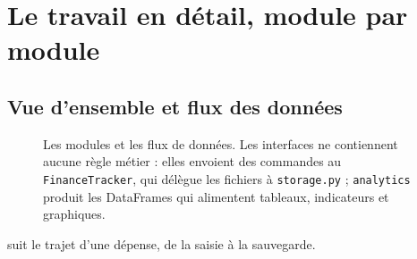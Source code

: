 \documentclass[11pt,a4paper]{article}
\newcommand{\code}[1]{{\NoAutoSpacing\texttt{#1}}}
\begin{document}
\section{Le travail en détail, module par module}

\subsection{Vue d'ensemble et flux des données}
\begin{figure}[H]
\centering

\caption{Les modules et les flux de données. Les interfaces ne contiennent aucune règle
métier : elles envoient des commandes au \code{FinanceTracker}, qui délègue les fichiers à
\code{storage.py} ; \code{analytics} produit les DataFrames qui alimentent tableaux,
indicateurs et graphiques.}
\label{figm-archi}
\end{figure}

 suit le trajet d'une dépense, de la saisie à la sauvegarde.
\end{document}
